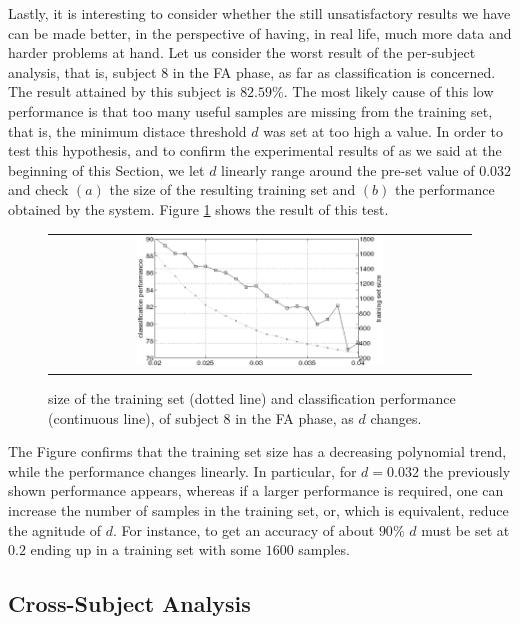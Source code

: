 Lastly, it is interesting to consider whether the still unsatisfactory
results we have can be made better, in the perspective of having, in
real life, much more data and harder problems at hand. Let us consider
the worst result of the per-subject analysis, that is, subject $8$ in
the FA phase, as far as classification is concerned. The result
attained by this subject is $82.59\%$. The most likely cause of this
low performance is that too many useful samples are missing from the
training set, that is, the minimum distace threshold $d$ was set at
too high a value. In order to test this hypothesis, and to confirm the
experimental results of
\cite{2008.BioCyb} as we said at the beginning of this Section, we
let $d$ linearly range around the pre-set value of $0.032$ and check
$(a)$ the size of the resulting training set and $(b)$ the performance
obtained by the system. Figure \ref{fig:subj8} shows the result of
this test.

\begin{figure}[!ht] \centering
  \begin{tabular}{c}
    \includegraphics[width=0.6\textwidth]{subj8.eps} \\
  \end{tabular}
  \caption{size of the training set (dotted line) and classification
    performance (continuous line), of subject $8$ in the FA phase, as
    $d$ changes.}
  \label{fig:subj8}
\end{figure}

The Figure confirms that the training set size has a decreasing
polynomial trend, while the performance changes linearly. In
particular, for $d=0.032$ the previously shown performance appears,
whereas if a larger performance is required, one can increase the
number of samples in the training set, or, which is equivalent, reduce
the agnitude of $d$. For instance, to get an accuracy of about $90\%$
$d$ must be set at $0.2$ ending up in a training set with some $1600$
samples.

\subsection{Cross-Subject Analysis}


